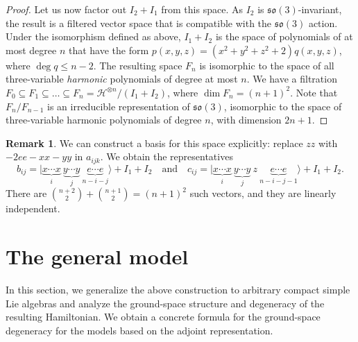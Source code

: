 \documentclass[a4paper]{article}
\newcommand{\ket}[1]{\vert #1 \rangle}
\newcommand{\so}{\mathfrak{so}}
\theoremstyle{definition}
\newtheorem{remark}[theorem]{Remark}
\begin{document}
\begin{proof}
Let us now factor out $I_2 + I_1$ from this space. As $I_2$ is $\so(3)$-invariant, the result is a filtered vector space that is compatible with the $\so(3)$ action. Under the isomorphism defined as above, $I_1 + I_2$ is the space of polynomials of at most degree $n$ that have the form $p(x,y,z) = (x^2 +y^2 + z^2+2) q(x,y,z)$, where $\deg q\le n-2$. The resulting space $F_n$ is isomorphic to the space of all three-variable \emph{harmonic} polynomials of degree at most $n$.  We have a filtration $F_0\subseteq F_1 \subseteq \dots \subseteq F_n = \mathcal{H}^{\otimes n}/(I_1 + I_2)$, where $\dim F_n = (n+1)^2$. Note that $F_{n}/F_{n-1}$ is an irreducible representation of $\so(3)$, isomorphic to the space of three-variable harmonic polynomials of degree $n$,  with dimension $2n+1$.
\end{proof}


\begin{remark} We can construct a basis for this space explicitly: replace $zz$ with $-2ee-xx-yy$ in $a_{ijk}$. We obtain the representatives
\begin{equation}\label{eq:bijcij}
    b_{ij} = \ket{\underbrace{x\cdots x}_{i} \ \underbrace{y \cdots y}_j \ \underbrace{e\cdots e}_{n-i-j}} + I_1 + I_2 \quad \text{and} \quad c_{ij}=\ket{\underbrace{x\cdots x}_{i} \ \underbrace{y \cdots y}_j \ z \ \underbrace{e\cdots e}_{n-i-j-1}} + I_1 +I_2.
\end{equation}
There are $\binom{n+2}{2} + \binom{n+1}{2} = (n+1)^2$ such vectors, and they are linearly independent.
\end{remark}

\section{The general model}\label{sec:general}

In this section, we generalize the above construction to arbitrary compact simple Lie algebras and analyze the ground-space structure and degeneracy of the resulting Hamiltonian. We obtain a concrete formula for the ground-space degeneracy for the models based on the adjoint representation.
\end{document}
